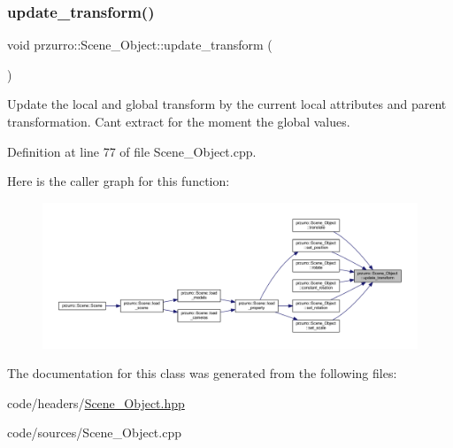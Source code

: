 \subsubsection{\texorpdfstring{update\_transform()}{update\_transform()}}
{\footnotesize\ttfamily void przurro\+::\+Scene\+\_\+\+Object\+::update\+\_\+transform (\begin{DoxyParamCaption}{ }\end{DoxyParamCaption})}



Update the local and global transform by the current local attributes and parent transformation. Can\textquotesingle{}t extract for the moment the global values. 



Definition at line 77 of file Scene\+\_\+\+Object.\+cpp.

Here is the caller graph for this function\+:
\nopagebreak
\begin{figure}[H]
\begin{center}
\leavevmode
\includegraphics[width=350pt]{d9/d84/classprzurro_1_1_scene___object_aa995f210f23d6e36477c6745cd3bb097_icgraph}
\end{center}
\end{figure}


The documentation for this class was generated from the following files\+:\begin{DoxyCompactItemize}
\item 
code/headers/\mbox{\hyperlink{_scene___object_8hpp}{Scene\+\_\+\+Object.\+hpp}}\item 
code/sources/Scene\+\_\+\+Object.\+cpp\end{DoxyCompactItemize}
